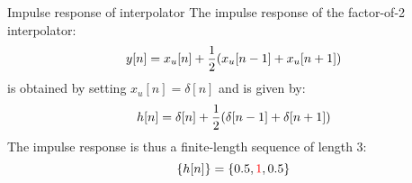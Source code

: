 \documentclass[../../main/main.tex]{subfiles}
\begin{document}
\begin{example}{Impulse response of interpolator}{}
    The impulse response of the factor-of-2 interpolator:
    \begin{equation}
        y[n]
        =
        x_{u}[n] + \frac{1}{2} \qty(x_{u}[n-1] + x_{u}[n+1])
        \label{eq:L05_S06_1}
    \end{equation}
    is obtained by setting \( x_{u}[n] = \delta[n] \) and is given by:
    \begin{equation}
        h[n]
        =
        \delta[n] + \frac{1}{2} \qty(\delta[n-1] + \delta[n+1])
        \label{eq:L05_S06_2}
    \end{equation}
    The impulse response is thus a finite-length sequence of length \( 3 \):
    \begin{equation}
        \qty{h[n]}
        =
        \qty{0.5, {\color{red}1}, 0.5}
        \label{eq:L05_S06_3}
    \end{equation}
\end{example}
\end{document}
